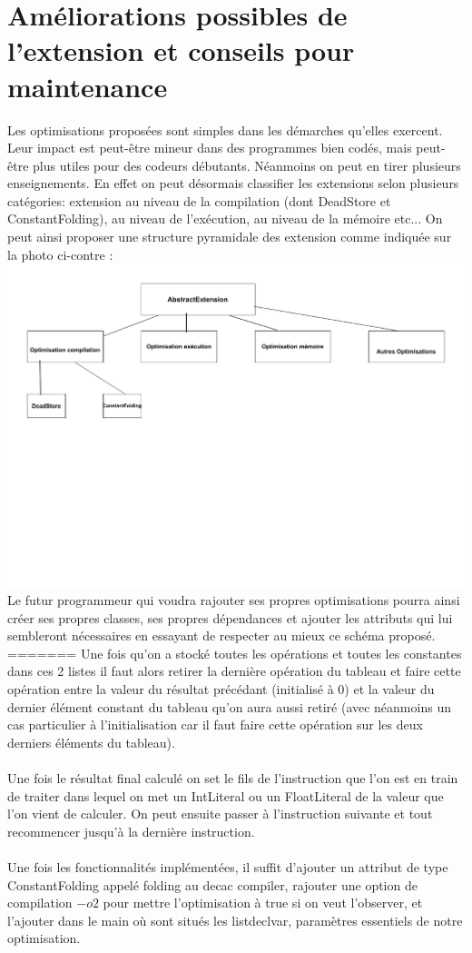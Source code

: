 \documentclass[a4paper]{article}
\begin{document}
\section{Améliorations possibles de l'extension et conseils pour maintenance}
Les optimisations proposées sont simples dans les démarches qu'elles exercent. Leur impact est peut-être mineur dans des programmes bien codés, mais peut-être plus utiles pour des codeurs débutants. Néanmoins on peut en tirer plusieurs enseignements.
En effet on peut désormais classifier les extensions selon plusieurs catégories: extension au niveau de la compilation (dont DeadStore et ConstantFolding), au niveau de l'exécution, au niveau de la mémoire etc...
On peut ainsi proposer une structure pyramidale des extension comme indiquée sur la photo ci-contre :\\
\includegraphics[scale=0.5]{UML.pdf}\\
Le futur programmeur qui voudra rajouter ses propres optimisations pourra ainsi créer ses propres classes, ses propres dépendances et ajouter les attributs qui lui sembleront nécessaires en essayant de respecter au mieux ce schéma proposé.
=======
Une fois qu'on a stocké toutes les opérations et toutes les constantes dans ces 2 listes il faut alors retirer la dernière opération du tableau et faire cette opération entre la valeur du résultat précédant (initialisé à 0) et la valeur du dernier élément constant du tableau qu'on aura aussi retiré (avec néanmoins un cas particulier à l'initialisation car il faut faire cette opération sur les deux derniers éléments du tableau).\\ \\
Une fois le résultat final calculé on set le fils de l'instruction que l'on est en train de traiter dans lequel on met un IntLiteral ou un FloatLiteral de la valeur que l'on vient de calculer. On peut ensuite passer à l'instruction suivante et tout recommencer jusqu'à la dernière instruction.\\ \\
Une fois les fonctionnalités implémentées, il suffit d'ajouter un attribut de type ConstantFolding appelé folding au decac compiler, rajouter une option de compilation $-o2$ pour mettre l'optimisation à true si on veut l'observer, et l'ajouter dans le main où sont situés les listdeclvar, paramètres essentiels de notre optimisation.
\end{document}
